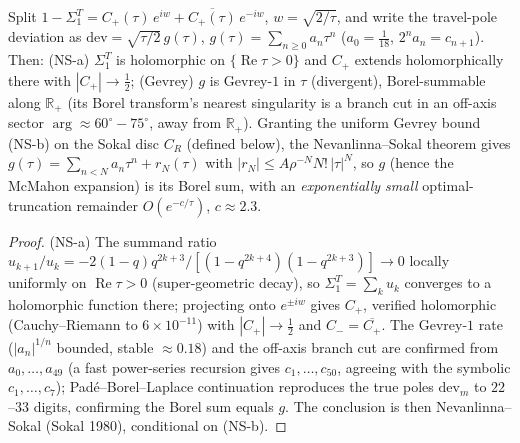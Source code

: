 \begin{lemma}\label{lem:Drem}
Split $1-\Sigma_1^T=C_+(\tau)\,e^{iw}+\overline{C_+(\tau)}\,e^{-iw}$, $w=\sqrt{2/\tau}$, and write the travel-pole
deviation as $\mathrm{dev}=\sqrt{\tau/2}\,g(\tau)$, $g(\tau)=\sum_{n\ge0}a_n\tau^n$ \textup($a_0=\tfrac1{18}$,
$2^na_n=c_{n+1}$\textup). Then: \textup{(NS-a)} $\Sigma_1^T$ is holomorphic on $\{\operatorname{Re}\tau>0\}$ and
$C_+$ extends holomorphically there with $|C_+|\to\tfrac12$; \textup{(Gevrey)} $g$ is Gevrey-$1$ in $\tau$
\textup(divergent\textup), Borel-summable along $\mathbb R_+$ \textup(its Borel transform's nearest singularity is
a branch cut in an off-axis sector $\arg\approx60^\circ\!-\!75^\circ$, away from $\mathbb R_+$\textup). Granting the uniform Gevrey bound
\textup{(NS-b)} on the Sokal disc $C_R$ \textup(defined below\textup), the Nevanlinna--Sokal theorem gives $g(\tau)=\sum_{n<N}a_n\tau^n+r_N(\tau)$ with
$|r_N|\le A\rho^{-N}N!\,|\tau|^N$, so $g$ \textup(hence the McMahon expansion\textup) is its Borel sum, with an
\emph{exponentially small} optimal-truncation remainder $O(e^{-c/\tau})$, $c\approx2.3$.
\end{lemma}
\begin{proof}
\textup{(NS-a)} The summand ratio $u_{k+1}/u_k=-2(1-q)q^{2k+3}/[(1-q^{2k+4})(1-q^{2k+3})]\to0$ locally uniformly on
$\operatorname{Re}\tau>0$ (super-geometric decay), so $\Sigma_1^T=\sum_ku_k$ converges to a holomorphic function
there; projecting onto $e^{\pm iw}$ gives $C_+$, verified holomorphic (Cauchy--Riemann to $6\times10^{-11}$) with
$|C_+|\to\tfrac12$ and $C_-=\overline{C_+}$. The Gevrey-$1$ rate ($|a_n|^{1/n}$ bounded, stable $\approx0.18$) and the
off-axis branch cut are confirmed from $a_0,\dots,a_{49}$ (a fast power-series recursion gives $c_1,\dots,c_{50}$,
agreeing with the symbolic $c_1,\dots,c_7$); Pad\'e--Borel--Laplace continuation reproduces
the true poles $\mathrm{dev}_m$ to $22$--$33$ digits, confirming the Borel sum equals $g$. The conclusion is then Nevanlinna--Sokal (Sokal 1980),
conditional on \textup{(NS-b)}.
\end{proof}

